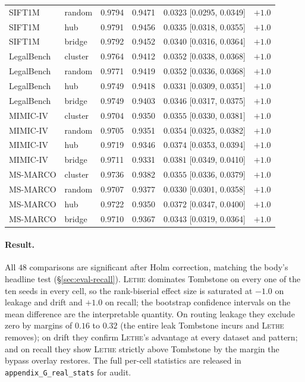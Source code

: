 \documentclass[sigconf, nonacm, review]{acmart}
\begin{document}
\begin{table}[t]
\begin{tabular}{@{}llrrlr@{}}
SIFT1M & random & 0.9794 & 0.9471 & $0.0323$ [0.0295, 0.0349] & $+1.0$ \\
SIFT1M & hub & 0.9791 & 0.9456 & $0.0335$ [0.0318, 0.0355] & $+1.0$ \\
SIFT1M & bridge & 0.9792 & 0.9452 & $0.0340$ [0.0316, 0.0364] & $+1.0$ \\
LegalBench & cluster & 0.9764 & 0.9412 & $0.0352$ [0.0338, 0.0368] & $+1.0$ \\
LegalBench & random & 0.9771 & 0.9419 & $0.0352$ [0.0336, 0.0368] & $+1.0$ \\
LegalBench & hub & 0.9749 & 0.9418 & $0.0331$ [0.0309, 0.0351] & $+1.0$ \\
LegalBench & bridge & 0.9749 & 0.9403 & $0.0346$ [0.0317, 0.0375] & $+1.0$ \\
MIMIC-IV & cluster & 0.9704 & 0.9350 & $0.0355$ [0.0330, 0.0381] & $+1.0$ \\
MIMIC-IV & random & 0.9705 & 0.9351 & $0.0354$ [0.0325, 0.0382] & $+1.0$ \\
MIMIC-IV & hub & 0.9719 & 0.9346 & $0.0374$ [0.0353, 0.0394] & $+1.0$ \\
MIMIC-IV & bridge & 0.9711 & 0.9331 & $0.0381$ [0.0349, 0.0410] & $+1.0$ \\
MS-MARCO & cluster & 0.9736 & 0.9382 & $0.0355$ [0.0336, 0.0379] & $+1.0$ \\
MS-MARCO & random & 0.9707 & 0.9377 & $0.0330$ [0.0301, 0.0358] & $+1.0$ \\
MS-MARCO & hub & 0.9722 & 0.9350 & $0.0372$ [0.0347, 0.0400] & $+1.0$ \\
MS-MARCO & bridge & 0.9710 & 0.9367 & $0.0343$ [0.0319, 0.0364] & $+1.0$ \\
\bottomrule
\end{tabular}
\end{table}

\paragraph{Result.}
All $48$ comparisons are significant after Holm correction, matching the body's
headline test (\S\ref{sec:eval-recall}). \textsc{Lethe} dominates Tombstone on
every one of the ten seeds in every cell, so the rank-biserial effect size is
saturated at $-1.0$ on leakage and drift and $+1.0$ on recall; the bootstrap
confidence intervals on the mean difference are the interpretable quantity. On
routing leakage they exclude zero by margins of $0.16$ to $0.32$ (the entire
leak Tombstone incurs and \textsc{Lethe} removes); on drift they confirm
\textsc{Lethe}'s advantage at every dataset and pattern; and on recall they show
\textsc{Lethe} strictly above Tombstone by the margin the bypass overlay
restores. The full per-cell statistics are released in
\texttt{appendix\_G\_real\_stats} for audit.
\end{document}
